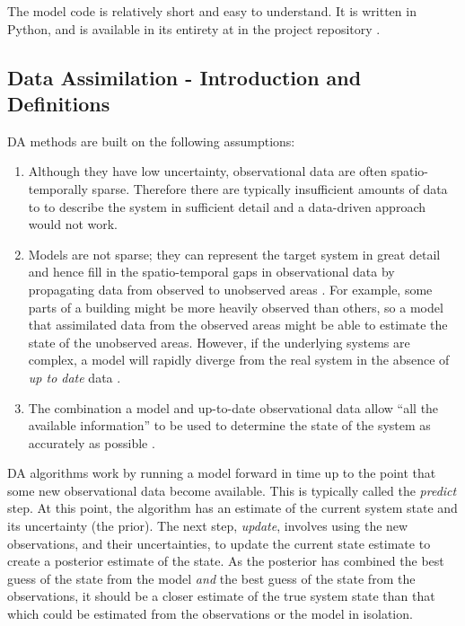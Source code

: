 The model code is relatively short and easy to understand. It is written in Python, and is available in its entirety at in the project repository \citep{stationsimgit}.


\subsection{Data Assimilation - Introduction and Definitions}

DA methods are built on the following assumptions: 

\begin{enumerate}
	\item Although they have low uncertainty, observational data are often spatio-temporally sparse. Therefore there are typically insufficient amounts of data to to describe the system in sufficient detail and a data-driven approach would not work.
	\item Models are not sparse; they can represent the target system in great detail and hence fill in the spatio-temporal gaps in observational data by propagating data from observed to unobserved areas \citep{carrassi_data_2018}. For example, some parts of a building might be more heavily observed than others, so a model that assimilated data from the observed areas might be able to estimate the state of the unobserved areas. However, if the underlying systems are complex, a model will rapidly diverge from the real system in the absence of \textit{up to date} data \citep{ward_dynamic_2016}.
	\item The combination a model and up-to-date observational data allow ``all the available information'' to be used to determine the state of the system as accurately as possible \citep{talagrand_use_1991}. 
\end{enumerate}

DA algorithms work by running a model forward in time up to the point that some new observational data become available. This is typically called the \textit{predict} step. At this point, the algorithm has an estimate of the current system state and its uncertainty (the prior). The next step, \textit{update},  involves using the new observations, and their uncertainties, to update the current state estimate to create a posterior estimate of the state. As the posterior has combined the best guess of the state from the model \textit{and} the best guess of the state from the observations, it should be a closer estimate of the true system state than that which could be estimated from the observations or the model in isolation.

